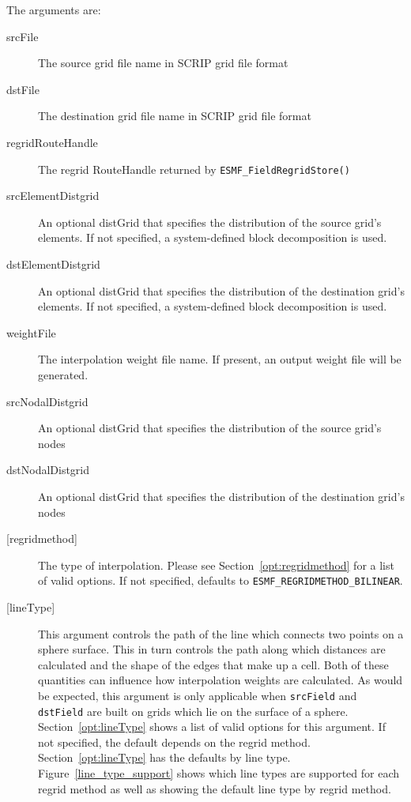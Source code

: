    The arguments are:
     \begin{description}
     \item [srcFile]
       The source grid file name in SCRIP grid file format
     \item [dstFile]
       The destination grid file name in SCRIP grid file format
     \item [regridRouteHandle]
       The regrid RouteHandle returned by {\tt ESMF\_FieldRegridStore()}
     \item [srcElementDistgrid]
       An optional distGrid that specifies the distribution of the source grid's elements. If not
       specified, a system-defined block decomposition is used.
     \item [dstElementDistgrid]
       An optional distGrid that specifies the distribution of the destination grid's elements. If
       not specified, a system-defined block decomposition is used.
     \item [weightFile]
       The interpolation weight file name. If present, an output weight file will be generated.
     \item [srcNodalDistgrid]
       An optional distGrid that specifies the distribution of the source grid's nodes
     \item [dstNodalDistgrid]
       An optional distGrid that specifies the distribution of the destination grid's nodes
     \item [{[regridmethod]}]
       The type of interpolation. Please see Section~\ref{opt:regridmethod}
       for a list of valid options. If not specified, defaults to
       {\tt ESMF\_REGRIDMETHOD\_BILINEAR}.
     \item [{[lineType]}]
             This argument controls the path of the line which connects two points on a sphere surface. This in
             turn controls the path along which distances are calculated and the shape of the edges that make
             up a cell. Both of these quantities can influence how interpolation weights are calculated.
             As would be expected, this argument is only applicable when {\tt srcField} and {\tt dstField} are
             built on grids which lie on the surface of a sphere. Section~\ref{opt:lineType} shows a
             list of valid options for this argument. If not specified, the default depends on the
             regrid method. Section~\ref{opt:lineType} has the defaults by line type. Figure~\ref{line_type_support} shows
             which line types are supported for each regrid method as well as showing the default line type by regrid method.

\end{description}

